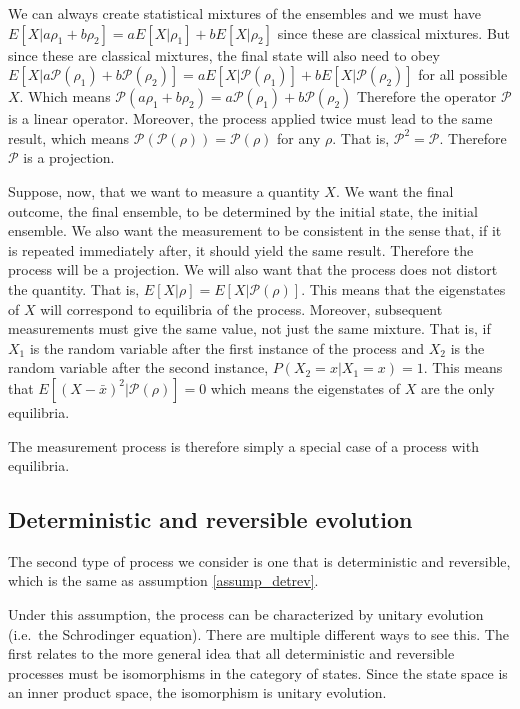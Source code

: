 \documentclass[11pt,letterpaper,fleqn]{memoir} %
\begin{document}
We can always create statistical mixtures of the ensembles and we must have $E[X|a \rho_1 + b \rho_2] = a E[X|\rho_1] + b E[X|\rho_2]$ since these are classical mixtures. But since these are classical mixtures, the final state will also need to obey $E[X|a \mathcal{P}(\rho_1) + b \mathcal{P}(\rho_2)] = a E[X|\mathcal{P}(\rho_1)] + b E[X|\mathcal{P}(\rho_2)]$ for all possible $X$. Which means $\mathcal{P}(a \rho_1 + b \rho_2) = a \mathcal{P}(\rho_1) + b \mathcal{P}(\rho_2)$ Therefore the operator $\mathcal{P}$ is a linear operator. Moreover, the process applied twice must lead to the same result, which means $\mathcal{P}(\mathcal{P}(\rho)) = \mathcal{P}(\rho)$ for any $\rho$. That is, $\mathcal{P}^2 = \mathcal{P}$. Therefore $\mathcal{P}$ is a projection.

Suppose, now, that we want to measure a quantity $X$. We want the final outcome, the final ensemble, to be determined by the initial state, the initial ensemble. We also want the measurement to be consistent in the sense that, if it is repeated immediately after, it should yield the same result. Therefore the process will be a projection. We will also want that the process does not distort the quantity. That is, $E[X|\rho] = E[X|\mathcal{P}(\rho)]$. This means that the eigenstates of $X$ will correspond to equilibria of the process. Moreover, subsequent measurements must give the same value, not just the same mixture. That is, if $X_1$ is the random variable after the first instance of the process and $X_2$ is the random variable after the second instance, $P(X_2 = x| X_1 = x ) = 1$. This means that $E[(X - \bar{x})^2|\mathcal{P}(\rho)] = 0$ which means the eigenstates of $X$ are the only equilibria.

The measurement process is therefore simply a special case of a process with equilibria.

\subsection{Deterministic and reversible evolution}

The second type of process we consider is one that is deterministic and reversible, which is the same as assumption \ref{assump_detrev}.

Under this assumption, the process can be characterized by unitary evolution (i.e.~the Schrodinger equation). There are multiple different ways to see this. The first relates to the more general idea that all deterministic and reversible processes must be isomorphisms in the category of states. Since the state space is an inner product space, the isomorphism is unitary evolution.
\end{document}
